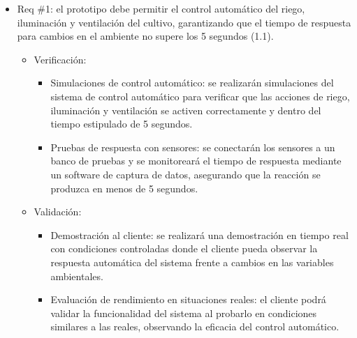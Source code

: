 \documentclass[
11pt, %
]{charter}
\begin{document}
\begin{itemize}
\item Req \#1: el prototipo debe permitir el control automático del riego, iluminación y ventilación del cultivo, garantizando que el tiempo de respuesta para cambios en el ambiente no supere los 5 segundos (1.1).
\begin{itemize}
    \item Verificación:
    \begin{itemize}
        \item Simulaciones de control automático: se realizarán simulaciones del sistema de control automático para verificar que las acciones de riego, iluminación y ventilación se activen correctamente y dentro del tiempo estipulado de 5 segundos.
        \item Pruebas de respuesta con sensores: se conectarán los sensores a un banco de pruebas y se monitoreará el tiempo de respuesta mediante un software de captura de datos, asegurando que la reacción se produzca en menos de 5 segundos.
    \end{itemize}
    \item Validación:
    \begin{itemize}
        \item Demostración al cliente: se realizará una demostración en tiempo real con condiciones controladas donde el cliente pueda observar la respuesta automática del sistema frente a cambios en las variables ambientales.
        \item Evaluación de rendimiento en situaciones reales: el cliente podrá validar la funcionalidad del sistema al probarlo en condiciones similares a las reales, observando la eficacia del control automático.
    \end{itemize}
\end{itemize}


\end{itemize}
\end{document}
